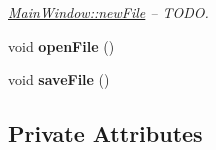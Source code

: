 \begin{DoxyCompactItemize}
\begin{DoxyCompactList}\small\item\em \hyperlink{class_main_window_a69f73b93cc05c89a9ae1be0161105982}{Main\+Window\+::new\+File} -- T\+O\+DO. \end{DoxyCompactList}\item 
\mbox{\label{class_main_window_a288b768c3c21a9171bdc56fe845ece8b}} 
void {\bfseries open\+File} ()
\item 
\mbox{\label{class_main_window_a464aaa4d378e7b2d814756a73d6e1ed6}} 
void {\bfseries save\+File} ()
\end{DoxyCompactItemize}
\subsection*{Private Attributes}
